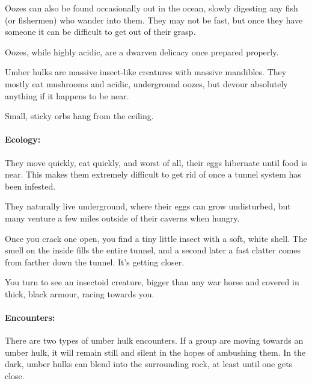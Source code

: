 \begin{multicols}{2}
Oozes can also be found occasionally out in the ocean, slowly digesting any fish (or fishermen) who wander into them.
They may not be fast, but once they have someone it can be difficult to get out of their grasp.

Oozes, while highly acidic, are a dwarven delicacy once prepared properly.

\jelly

\jelly

\label{umber_hulk}

Umber hulks are massive insect-like creatures with massive mandibles.
They mostly eat mushrooms and acidic, underground oozes, but devour absolutely anything if it happens to be near.

\begin{boxtext}

	Small, sticky orbs hang from the ceiling.

\end{boxtext}

\paragraph{Ecology:}
They move quickly, eat quickly, and worst of all, their eggs hibernate until food is near.
This makes them extremely difficult to get rid of once a tunnel system has been infested.

They naturally live underground, where their eggs can grow undisturbed, but many venture a few miles outside of their caverns when hungry.

\begin{boxtext}

	Once you crack one open, you find a tiny little insect with a soft, white shell.
	The smell on the inside fills the entire tunnel, and a second later a fast clatter comes from farther down the tunnel.
	It's getting closer.

	You turn to see an insectoid creature, bigger than any war horse and covered in thick, black armour, racing towards you.

\end{boxtext}

\paragraph{Encounters:}
There are two types of umber hulk encounters.
If a group are moving towards an umber hulk, it will remain still and silent in the hopes of ambushing them.
In the dark, umber hulks can blend into the surrounding rock, at least until one gets close.


\end{multicols}
